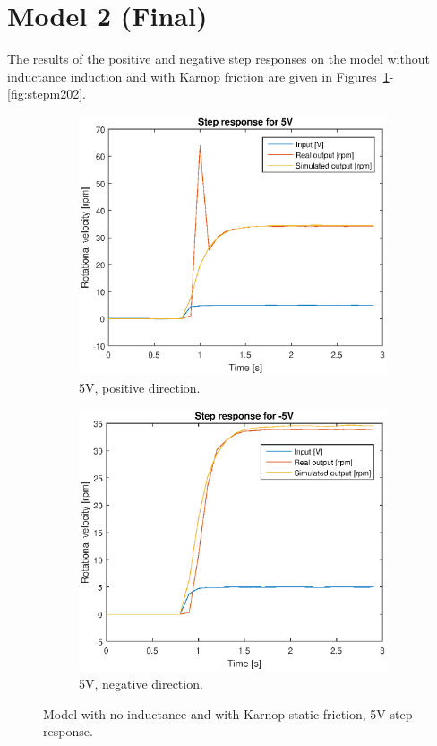 \section*{Model 2 (Final)}
The results of the positive and negative step responses on the model without
inductance induction and with Karnop friction are given in Figures~\ref{fig:step52}-
\ref{fig:stepm202}.
\begin{figure}[H]
    \centering
    \begin{subfigure}[H]{0.48\textwidth}
    \includegraphics[width=\textwidth]{./img/testrig_5Vstep_no_i_fric.eps}
    \caption{5V, positive direction.}
    \label{fig:step52}
    \end{subfigure}
    \begin{subfigure}[H]{0.48\textwidth}
    \includegraphics[width=\textwidth]{./img/testrig_m5Vstep_no_i_fric.eps}
    \caption{5V, negative direction.}
    \label{fig:stepm52}
    \end{subfigure}
    \caption{Model with no inductance and with Karnop static friction, 5V step response.}
\end{figure}
